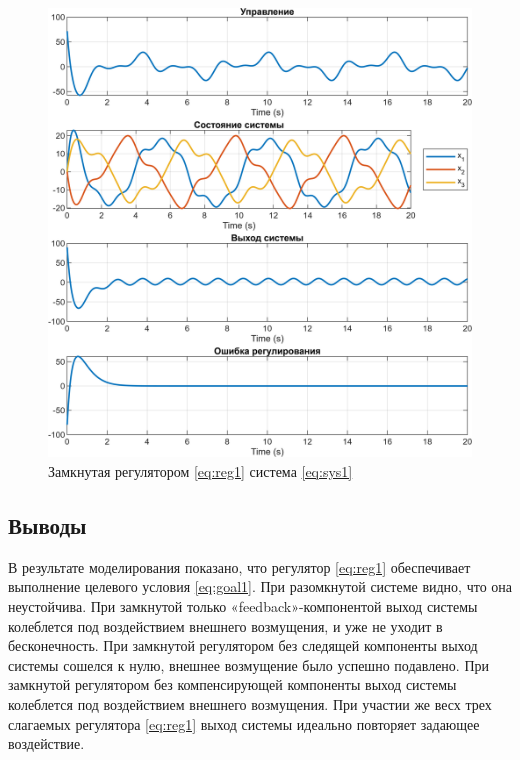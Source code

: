 \begin{figure}[H]
    \centering
    \includegraphics[width=\linewidth]{figs/14_sim.png}
    \caption{Замкнутая регулятором \eqref{eq:reg1} система \eqref{eq:sys1}}
    \label{fig:14sim}
\end{figure}

\subsection{Выводы}

В результате моделирования показано, что регулятор \eqref{eq:reg1} 
обеспечивает выполнение целевого условия \eqref{eq:goal1}. При разомкнутой системе
видно, что она неустойчива. При замкнутой только «feedback»-компонентой выход системы
колеблется под воздействием внешнего возмущения, и уже не уходит в бесконечность.
При замкнутой регулятором без следящей компоненты выход системы сошелся к нулю,
внешнее возмущение было успешно подавлено. При замкнутой регулятором без компенсирующей компоненты выход системы
колеблется под воздействием внешнего возмущения. При участии же весх трех слагаемых
регулятора \eqref{eq:reg1} выход системы идеально повторяет задающее воздействие.






